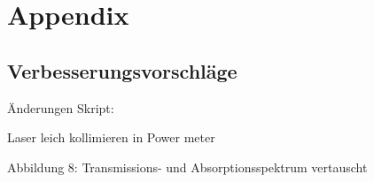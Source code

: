 \section{Appendix}

\subsection{Verbesserungsvorschläge}

Änderungen Skript:

Laser leich kollimieren in Power meter

Abbildung 8: Transmissions- und Absorptionsspektrum vertauscht